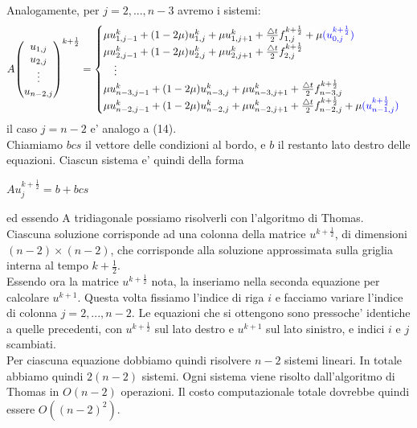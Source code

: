 \documentclass[]{article}
\begin{document}
Analogamente, per $j = 2,...,n-3 $ avremo i sistemi:
\begin{equation}
A {\begin{pmatrix}
	u_{1,j}\\
	u_{2,j}\\
	\vdots\\
	u_{n-2,j}
	\end{pmatrix}}^{k+\frac{1}{2}} = 
\begin{cases}
\mu u^k_{1,j-1} + (1-2\mu)u^k_{1,j} + \mu u^k_{1,j+1} + \frac{\bigtriangleup t}{2}f^{k+\frac{1}{2}}_{1,j} + \mu \color{blue}{(u^{k+\frac{1}{2}}_{0,j})}\\
\mu u^k_{2,j-1} + (1-2\mu)u^k_{2,j} + \mu u^k_{2,j+1} + \frac{\bigtriangleup t}{2}f^{k+\frac{1}{2}}_{2,j}\\
\quad \vdots\\
\mu u^k_{n-3,j-1} + (1-2\mu)u^k_{n-3,j} + \mu u^k_{n-3,j+1} + \frac{\bigtriangleup t}{2}f^{k+\frac{1}{2}}_{n-3,j}\\
\mu u^k_{n-2,j-1} + (1-2\mu)u^k_{n-2,j} + \mu u^k_{n-2,j+1} + \frac{\bigtriangleup t}{2}f^{k+\frac{1}{2}}_{n-2,j} + \mu \color{blue}{(u^{k+\frac{1}{2}}_{n-1,j})}\\
\end{cases}
\end{equation}
il caso $j = n-2$ e' analogo a (14).\\
Chiamiamo $bcs$ il vettore delle condizioni al bordo, e $b$ il restanto lato destro delle equazioni.
Ciascun sistema e' quindi della forma
\begin{center}
	$Au^{k+\frac{1}{2}}_j = b + bcs$
\end{center}
ed essendo A tridiagonale possiamo risolverli con l'algoritmo di Thomas. Ciascuna soluzione corrisponde ad una colonna della matrice  $u^{k+\frac{1}{2}}$, di dimensioni $(n-2) \times (n-2)$, che corrisponde alla soluzione approssimata sulla griglia interna al tempo $k+\frac{1}{2}$.\\

Essendo ora la matrice $u^{k+\frac{1}{2}}$ nota, la inseriamo nella seconda equazione per calcolare $u^{k+1}$.
Questa volta fissiamo l'indice di riga $i$ e facciamo variare l'indice di colonna $j = 2,...,n-2$.
Le equazioni che si ottengono sono pressoche' identiche a quelle precedenti, con $u^{k+\frac{1}{2}}$ sul lato destro e $u^{k+1}$ sul lato sinistro, e indici $i$ e $j$ scambiati.\\
Per ciascuna equazione dobbiamo quindi risolvere $n-2$ sistemi lineari. In totale abbiamo quindi $2(n-2)$ sistemi. Ogni sistema viene risolto dall'algoritmo di Thomas in $O(n-2)$ operazioni. Il costo computazionale totale dovrebbe quindi essere $O((n-2)^2)$.
\end{document}
